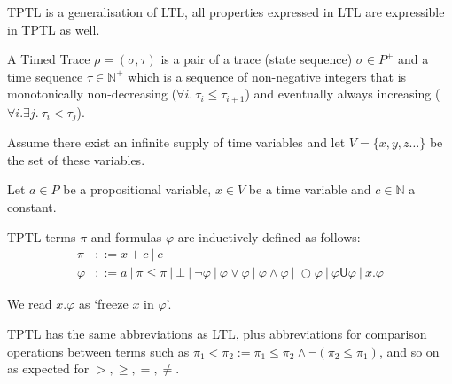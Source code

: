 \documentclass[a4paper]{article}
\newcommand{\U}{\mathsf{U}}
\begin{document}
TPTL is a generalisation of LTL, all properties expressed in LTL are expressible in TPTL as well.



\begin{defn}

  A Timed Trace $\rho = (\sigma,\tau)$ is a pair of a trace (state sequence) $\sigma \in P^+$ and a time sequence $\tau \in \mathbb{N}^+$ which is a sequence of non-negative integers that is monotonically non-decreasing ($\forall i. ~\tau_i \leq \tau_{i+1}$) and eventually always increasing ($\forall i. \exists j. ~\tau_i < \tau_j$).
\end{defn}

Assume there exist an infinite supply of time variables  and let $V=\{x,y,z\dots\}$ be the set of these variables.

\begin{defn}\label{tptlsyn}
  Let $a\in P$ be a propositional variable, $x\in V$ be a time variable and $c\in\mathbb{N}$ a constant.

  TPTL terms $\pi$ and formulas $\varphi$ are inductively defined as follows:
  \begin{align*}
    \pi &::= x + c ~|~ c\\
    \varphi &::= a ~|~ \pi \leq \pi ~|~ \bot ~|~ \neg \varphi ~|~\varphi \lor \varphi ~|~ \varphi \land \varphi ~|~ \bigcirc \varphi ~|~ \varphi \U \varphi ~|~ x. \varphi
  \end{align*}
\end{defn}

We read $x. \varphi$ as `freeze $x$ in $\varphi$'.

\begin{notn}[Abbreviations]\label{tptlabbrev}

  TPTL has the same abbreviations as LTL, plus abbreviations for comparison operations between terms such as $\pi_1 < \pi_2 := \pi_1 \leq \pi_2 \land \neg(\pi_2 \leq \pi_1)$, and so on as expected for $>,\geq,=,\neq$.
\end{notn}
\end{document}
